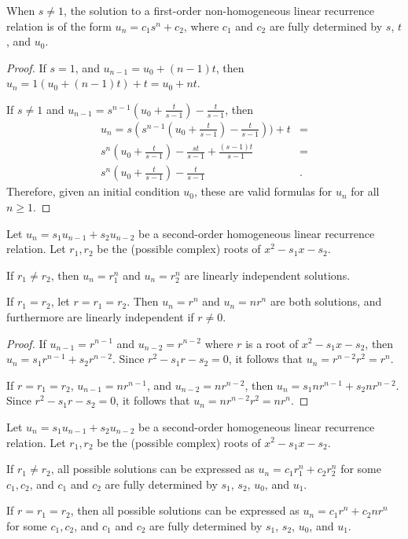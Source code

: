\begin{rmk}
    When $s \neq 1$, the solution to a first-order non-homogeneous linear recurrence relation is of the form $u_n = c_1s^n + c_2$, where $c_1$ and $c_2$ are fully determined by $s$, $t$, and $u_0$.
\end{rmk}

\begin{proof}\proofbreak
    If $s = 1$, and $u_{n-1} = u_0 + (n-1)t$, then $u_n = 1(u_0 + (n-1)t) + t = u_0 + nt$.

    If $s \neq 1$ and $u_{n-1} = s^{n-1}(u_0 + \frac{t}{s-1}) - \frac{t}{s-1}$, then
    \begin{align*}
        u_n = s(s^{n-1}(u_0 + \frac{t}{s-1}) - \frac{t}{s-1})) + t & = \\
        s^n(u_0 + \frac{t}{s-1}) - \frac{st}{s-1} + \frac{(s-1)t}{s-1} & = \\
        s^n(u_0 + \frac{t}{s-1}) - \frac{t}{s-1} &.
    \end{align*}
    Therefore, given an initial condition $u_0$, these are valid formulas for $u_n$ for all $n \geq 1$.
\end{proof}

\begin{thm}
    Let $u_n = s_1u_{n-1} + s_2u_{n-2}$ be a second-order homogeneous linear recurrence relation. Let $r_1, r_2$ be the (possible complex) roots of $x^2 - s_1x - s_2$.

    If $r_1 \neq r_2$, then $u_n = r_1^n$ and $u_n = r_2^n$ are linearly independent solutions.

    If $r_1 = r_2$, let $r = r_1 = r_2$. Then $u_n = r^n$ and $u_n = nr^n$ are both solutions, and furthermore are linearly independent if $r \neq 0$.
\end{thm}

\begin{proof}\proofbreak
    If $u_{n-1} = r^{n-1}$ and $u_{n-2} = r^{n-2}$ where $r$ is a root of $x^2 - s_1x - s_2$, then $u_n = s_1r^{n-1} + s_2r^{n-2}$. Since $r^2 - s_1r - s_2 = 0$, it follows that $u_n = r^{n-2}r^2 = r^n$.

    If $r = r_1 = r_2$, $u_{n-1} = nr^{n-1}$, and $u_{n-2} = nr^{n-2}$, then $u_n = s_1nr^{n-1} + s_2nr^{n-2}$. Since $r^2 - s_1r - s_2 = 0$, it follows that $u_n = nr^{n-2}r^2 = nr^n$.
\end{proof}

\begin{thm}
    Let $u_n = s_1u_{n-1} + s_2u_{n-2}$ be a second-order homogeneous linear recurrence relation. Let $r_1, r_2$ be the (possible complex) roots of $x^2 - s_1x - s_2$.

    If $r_1 \neq r_2$, all possible solutions can be expressed as $u_n = c_1r_1^n + c_2r_2^n$  for some $c_1, c_2$, and $c_1$ and $c_2$ are fully determined by $s_1$, $s_2$, $u_0$, and $u_1$.

    If $r = r_1 = r_2$, then all possible solutions can be expressed as $u_n = c_1r^n + c_2nr^n$ for some $c_1, c_2$, and $c_1$ and $c_2$ are fully determined by $s_1$, $s_2$, $u_0$, and $u_1$.
\end{thm}

